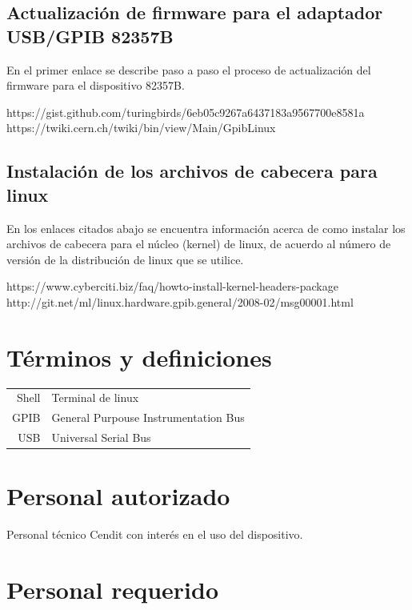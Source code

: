 \documentclass[paper=letter,oneside,fontsize=11pt, parskip=full]{scrartcl}
\newenvironment{link}
	{\ttfamily}{}
\begin{document}
	\subsection{Actualización de firmware para el adaptador USB/GPIB 82357B}
	
	En el primer enlace se describe paso a paso el proceso de actualización del firmware para el dispositivo 82357B.
	
	\begin{link}
		https://gist.github.com/turingbirds/6eb05c9267a6437183a9567700e8581a \\
		https://twiki.cern.ch/twiki/bin/view/Main/GpibLinux
	\end{link}
	
	\subsection{Instalación de los archivos de cabecera para linux}
	
	En los enlaces citados abajo se encuentra información acerca de como instalar los archivos de cabecera para el núcleo (kernel) de linux,  de acuerdo al número de versión de la distribución de linux que se utilice.
	
	\begin{link}
		https://www.cyberciti.biz/faq/howto-install-kernel-headers-package \\	
		http://git.net/ml/linux.hardware.gpib.general/2008-02/msg00001.html
	\end{link}
	
	\section{Términos y definiciones}
	
	\begin{tabular}{rl}
		Shell 	& 	Terminal de linux \\
		GPIB 	& 	General Purpouse Instrumentation Bus \\
		USB		&  	Universal Serial Bus \\
	\end{tabular}
	
	\section{Personal autorizado}
	
		Personal técnico Cendit con interés en el uso del dispositivo.
		
	\section{Personal requerido}
	
\end{document}
